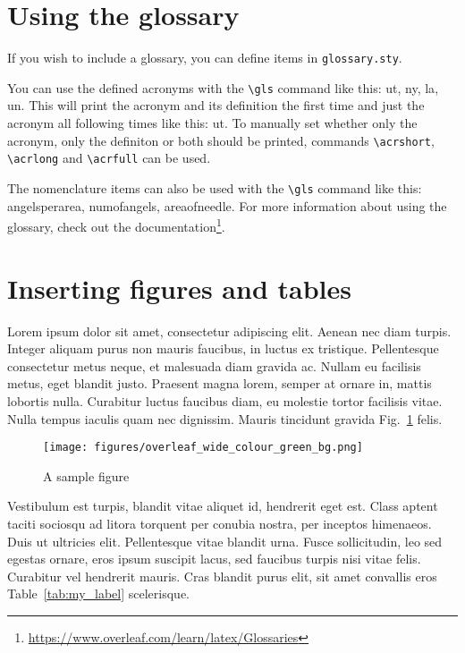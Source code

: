 \section{Using the glossary}
If you wish to include a glossary, you can define items in \texttt{glossary.sty}.

You can use the defined acronyms with the \texttt{\textbackslash gls} command like this: \gls{ut}, \gls{ny}, \gls{la}, \gls{un}. This will print the acronym and its definition the first time and just the acronym all following times like this: \gls{ut}. To manually set whether only the acronym, only the definiton or both should be printed, commands \texttt{\textbackslash acrshort}, \texttt{\textbackslash acrlong} and \texttt{\textbackslash acrfull} can be used.

The nomenclature items can also be used with the \texttt{\textbackslash gls} command like this: \gls{angelsperarea}, \gls{numofangels}, \gls{areaofneedle}. For more information about using the glossary, check out the documentation\footnote{\url{https://www.overleaf.com/learn/latex/Glossaries}}.

\section{Inserting figures and tables}

Lorem ipsum dolor sit amet, consectetur adipiscing elit. Aenean nec diam turpis. Integer aliquam purus non mauris faucibus, in luctus ex tristique. Pellentesque consectetur metus neque, et malesuada diam gravida ac. Nullam eu facilisis metus, eget blandit justo. Praesent magna lorem, semper at ornare in, mattis lobortis nulla. Curabitur luctus faucibus diam, eu molestie tortor facilisis vitae. Nulla tempus iaculis quam nec dignissim. Mauris tincidunt gravida Fig.~\ref{fig:my_label} felis.

\begin{figure}[htp]
    \centering
    \texttt{[image: figures/overleaf\_wide\_colour\_green\_bg.png]}
    \caption{A sample figure}
    \label{fig:my_label}
\end{figure}

Vestibulum est turpis, blandit vitae aliquet id, hendrerit eget est. Class aptent taciti sociosqu ad litora torquent per conubia nostra, per inceptos himenaeos. Duis ut ultricies elit. Pellentesque vitae blandit urna. Fusce sollicitudin, leo sed egestas ornare, eros ipsum suscipit lacus, sed faucibus turpis nisi vitae felis. Curabitur vel hendrerit mauris. Cras blandit purus elit, sit amet convallis eros Table~\ref{tab:my_label} scelerisque.

